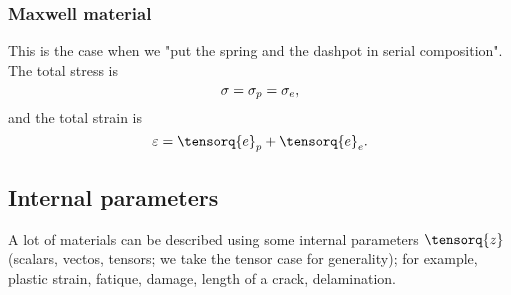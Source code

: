 \documentclass[11pt]{scrartcl} %
\begin{document}
\subsubsection{Maxwell material}
\label{sec:maxwell}
This is the case when we "put the spring and the dashpot in serial composition". The total stress is
\[
	\mathbb{\sigma} = \mathbb{\sigma}_p = \mathbb{\sigma}_e,
\]
and the total strain is
\[
	\varepsilon = \tensorq{e}_{p}+ \tensorq{e}_{e}.
\]


\subsection{Internal parameters}
\label{sec:internal_parameters}
A lot of materials can be described using some internal parameters $\tensorq{z}$ (scalars, vectos, tensors; we take the tensor case for generality); for example, plastic strain, fatique, damage, length of a crack, delamination.
\end{document}
